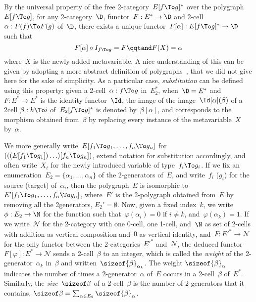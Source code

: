 \documentclass{LMCS}
\begin{document}
By the universal property of the free 2-category~$E[f\To g]^*$ over the
polygraph~$E[f\To g]$, for any 2-category~$\D$, functor~$F:E^*\to\D$ and
2-cell~$\alpha:F(f)\To F(g)$ of~$\D$, there exists a unique
functor~$F[\alpha]:E[f\To g]^*\to\D$ such that
\[
F[\alpha]\circ I_{f\To g}=F
\qqtand
F(X)=\alpha
\]
where~$X$ is the newly added metavariable. A nice understanding of this can be
given by adopting a more abstract definition of
polygraphs~\cite{guiraud-malbos:higher-cat-fdt, mimram:2-cp}, that we did not
give here for the sake of simplicity. As a particular case, \emph{substitution}
can be defined using this property: given a 2-cell~$\alpha:f\To g$ in~$E_2^*$,
when~$\D=E^*$ and~$F:E^*\to E^*$ is the identity functor~$\Id$, the image of the
image~$\Id[\alpha](\beta)$ of a 2\nbd{}cell $\beta:h\To i$ of~$E_2[f\To g]^*$ is
denoted by~$\beta[\alpha]$, and corresponds to the morphism obtained
from~$\beta$ by replacing every instance of the metavariable~$X$ by~$\alpha$.

We more generally write~$E[f_1\To g_1,\ldots,f_n\To g_n]$ for $(((E[f_1\To
g_1])\ldots)[f_n\To g_n])$, extend notation for substitution accordingly, and
often write~$X_i$ for the newly introduced variable of type~$f_i\To g_i$. If we
fix an enumeration~$E_2=\{\alpha_1,\ldots,\alpha_n\}$ of the 2-generators
of~$E$, and write~$f_i$ (\resp $g_i$) for the source (\resp target)
of~$\alpha_i$, then the polygraph~$E$ is isomorphic to~$E'[f_1\To
g_1,\ldots,f_n\To g_n]$, where~$E'$ is the 2-polygraph obtained from~$E$ by
removing all the 2\nbd{}generators, \ie $E_2'=\emptyset$. Now, given a fixed
index~$k$, we write~$\phi:E_2\to\N$ for the function such
that~$\varphi(\alpha_i)=0$ if $i\neq k$, and~$\varphi(\alpha_k)=1$. If we
write~$\mathcal{N}$ for the 2-category with one 0-cell, one 1-cell, and~$\N$ as
set of 2-cells with addition as vertical composition and~$0$ as vertical
identity, and~$F:E'^*\to\mathcal{N}$ for the only functor between the
2-categories~$E'^*$ and~$\mathcal{N}$, the deduced
functor~$F[\varphi]:E^*\to\mathcal{N}$ sends a 2-cell~$\beta$ to an integer,
which is called the \emph{weight} of the 2-generator~$\alpha_k$ in~$\beta$ and
written~$\sizeof{\beta}_{\alpha_k}$. The weight $\sizeof{\beta}_\alpha$
indicates the number of times a 2-generator~$\alpha$ of~$E$ occurs in a
2-cell~$\beta$ of~$E^*$. Similarly, the \emph{size}~$\sizeof\beta$ of a
2-cell~$\beta$ is the number of 2-generators that it contains, \ie $\sizeof\beta=\sum_{\alpha\in E_2}\sizeof{\beta}_\alpha$.
\end{document}
